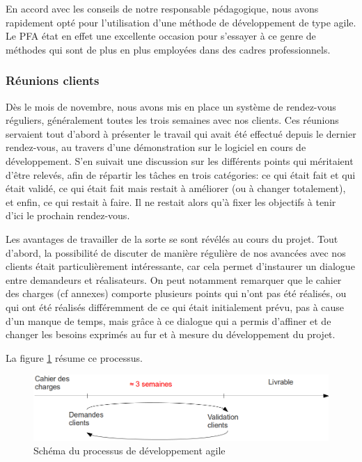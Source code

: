 En accord avec les conseils de notre responsable pédagogique, nous avons rapidement opté pour l'utilisation d'une méthode de développement de type agile. Le PFA état en effet une excellente occasion pour s'essayer à ce genre de méthodes qui sont de plus en plus employées dans des cadres professionnels.

\subsubsection{Réunions clients}

Dès le mois de novembre, nous avons mis en place un système de rendez-vous réguliers, généralement toutes les trois semaines avec nos clients. Ces réunions servaient tout d'abord à présenter le travail qui avait été effectué depuis le dernier rendez-vous, au travers d'une démonstration sur le logiciel en cours de développement. S'en suivait une discussion sur les différents points qui méritaient d'être relevés, afin de répartir les tâches en trois catégories: ce qui était fait et qui était validé, ce qui était fait mais restait à améliorer (ou à changer totalement), et enfin, ce qui restait à faire. Il ne restait alors qu'à fixer les objectifs à tenir d'ici le prochain rendez-vous.

Les avantages de travailler de la sorte se sont révélés au cours du projet. Tout d'abord, la possibilité de discuter de manière régulière de nos avancées avec nos clients était particulièrement intéressante, car cela permet d'instaurer un dialogue entre demandeurs et réalisateurs. On peut notamment remarquer que le cahier des charges (cf annexes) comporte plusieurs points qui n'ont pas été réalisés, ou qui ont été réalisés différemment de ce qui était initialement prévu, pas à cause d'un manque de temps, mais grâce à ce dialogue qui a permis d'affiner et de changer les besoins exprimés au fur et à mesure du développement du projet.

La figure \ref{agile} résume ce processus.

\begin{figure}[H]
\begin{center}
\includegraphics[width=450px]{methode_agile.png}
\caption{Schéma du processus de développement agile}
\label{agile}
\end{center}
\end{figure}

